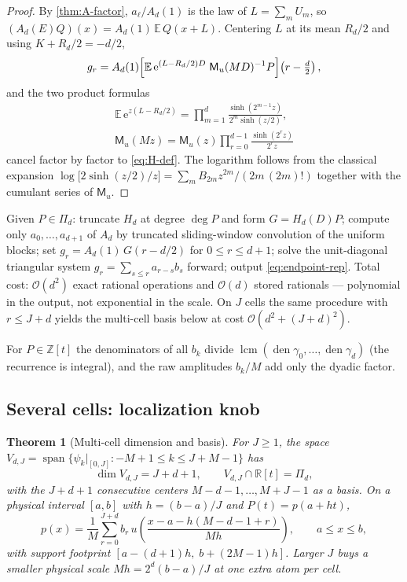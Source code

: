 \documentclass[11pt,oneside]{article}
\numberwithin{equation}{section}
\newtheorem{theorem}{Theorem}[section]
\theoremstyle{definition}
\theoremstyle{remark}
\newcommand{\R}{\mathbb R}
\newcommand{\Z}{\mathbb Z}
\newcommand{\E}{\mathbb E}
\newcommand{\e}{\mathrm e}
\newcommand{\bigO}{\mathcal O}
\newcommand{\Span}{\operatorname{span}}
\newcommand{\MM}{\mathsf M}
\newcommand{\PiD}{\Pi_d}
\begin{document}
\begin{proof}
By \cref{thm:A-factor}, $a_\ell/A_d(1)$ is the law of
$L=\sum_mU_m$, so $(A_d(E)Q)(x)=A_d(1)\,\E\,Q(x+L)$.  Centering $L$
at its mean $R_d/2$ and using $K+R_d/2=-d/2$,
\[
 g_r=A_d(1)\Bigl[
 \E\,\e^{(L-R_d/2)D}\;\MM_u(MD)^{-1}P
 \Bigr]\!\left(r-\tfrac d2\right),
\]
and the two product formulas
\begin{gather*}
 \E\,\e^{z(L-R_d/2)}
 =\prod_{m=1}^{d}\frac{\sinh(2^{m-1}z)}{2^{m}\sinh(z/2)},
 \\
 \MM_u(Mz)=\MM_u(z)\prod_{r=0}^{d-1}\frac{\sinh(2^{r}z)}{2^{r}z}
\end{gather*}
cancel factor by factor to \eqref{eq:H-def}.  The logarithm follows
from the classical expansion
$\log\bigl[2\sinh(z/2)/z\bigr]
=\sum_mB_{2m}z^{2m}/(2m\,(2m)!)$ together with the cumulant series
of $\MM_u$.
\end{proof}

\begin{algorithm}
\label{alg:fast}
Given $P\in\PiD$: truncate $H_d$ at degree $\deg P$ and form
$G=H_d(D)P$; compute only $a_0,\dots,a_{d+1}$ of $A_d$ by truncated
sliding-window convolution of the uniform blocks; set
$g_r=A_d(1)\,G(r-d/2)$ for $0\le r\le d+1$; solve the unit-diagonal
triangular system $g_r=\sum_{s\le r}a_{r-s}b_s$ forward; output
\eqref{eq:endpoint-rep}.  Total cost: $\bigO(d^{2})$ exact rational
operations and $\bigO(d)$ stored rationals --- polynomial in the
output, not exponential in the scale.  On $J$ cells the same
procedure with $r\le J+d$ yields the multi-cell basis below at cost
$\bigO(d^{2}+(J+d)^{2})$.
\end{algorithm}

For $P\in\Z[t]$ the denominators of all $b_k$ divide
$\operatorname{lcm}(\operatorname{den}\gamma_0,\dots,
\operatorname{den}\gamma_d)$ (the recurrence is integral), and the
raw amplitudes $b_k/M$ add only the dyadic factor.

\subsection{Several cells: localization knob}

\begin{theorem}[Multi-cell dimension and basis]
\label{thm:multicell}
For $J\ge1$, the space
$V_{d,J}=\Span\{\psi_k|_{[0,J]}:-M+1\le k\le J+M-1\}$ has
\begin{equation}
 \dim V_{d,J}=J+d+1,
 \qquad V_{d,J}\cap\R[t]=\PiD,
 \label{eq:multicell-dim}
\end{equation}
with the $J+d+1$ consecutive centers $M-d-1,\dots,M+J-1$ as a basis.
On a physical interval $[a,b]$ with $h=(b-a)/J$ and
$P(t)=p(a+ht)$,
\begin{equation}
 p(x)=\frac1M\sum_{r=0}^{J+d}b_r\,
 u\!\left(\frac{x-a-h(M-d-1+r)}{Mh}\right),
 \qquad a\le x\le b,
 \label{eq:physical}
\end{equation}
with support footprint $[a-(d+1)h,\;b+(2M-1)h]$.  Larger $J$ buys a
smaller physical scale $Mh=2^{d}(b-a)/J$ at one extra atom per cell.
\end{theorem}
\end{document}
